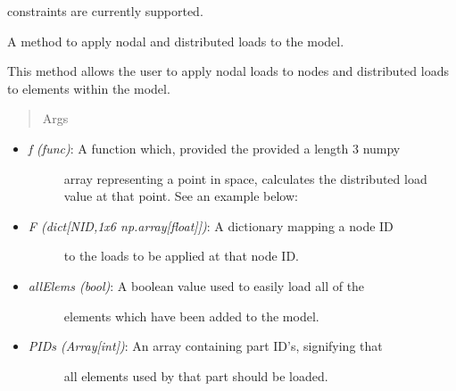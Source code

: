\documentclass[letterpaper,10pt,english]{sphinxmanual}
\begin{document}
\begin{fulllineitems}
\begin{fulllineitems}
constraints are currently supported.

\end{fulllineitems}


\begin{fulllineitems}
\label{FEM:AeroComBAT.FEM.Model.applyLoads}
A method to apply nodal and distributed loads to the model.

This method allows the user to apply nodal loads to nodes and
distributed loads to elements within the model.
\begin{quote}\begin{description}
\item[{Args}] \leavevmode
\end{description}\end{quote}
\begin{itemize}
\item {} \begin{description}
\item[{\emph{f (func)}: A function which, provided the provided a length 3 numpy}] \leavevmode
array representing a point in space, calculates the distributed
load value at that point. See an example below:

\end{description}

\item {} \begin{description}
\item[{\emph{F (dict{[}NID,1x6 np.array{[}float{]}{]})}: A dictionary mapping a node ID}] \leavevmode
to the loads to be applied at that node ID.

\end{description}

\item {} \begin{description}
\item[{\emph{allElems (bool)}: A boolean value used to easily load all of the}] \leavevmode
elements which have been added to the model.

\end{description}

\item {} \begin{description}
\item[{\emph{PIDs (Array{[}int{]})}: An array containing part ID's, signifying that}] \leavevmode
all elements used by that part should be loaded.


\end{description}
\end{itemize}
\end{fulllineitems}
\end{fulllineitems}
\end{document}
